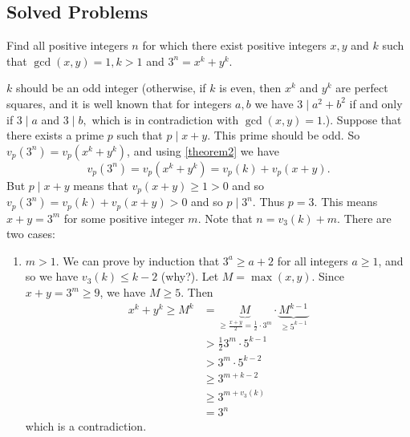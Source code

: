 \documentclass[main.tex]{subfile}
\begin{document}
\subsection{Solved Problems}


    \begin{problem}[Russia 1996]
        Find all positive integers $n$ for which there exist positive integers $x ,y$ and $k$ such that $\gcd(x,y)=1, k>1$ and $3^n = x^k + y^k.$
    \end{problem}

    \begin{solution}
        $k$ should be an odd integer (otherwise, if $k$ is even, then $x^k$ and $y^k$ are perfect squares, and it is well known that for integers $a,b$ we have $3 \mid a^2+b^2$ if and only if $3 \mid a$ and $3 \mid b,$ which is in contradiction with $\gcd(x,y)=1.$). Suppose that there exists a prime $p$ such that $p \mid x+y$. This prime should be odd. So $v_p(3^n)=v_p(x^k+y^k)$, and using \eqref{theorem2} we have $$v_p(3^n)=v_p(x^k+y^k)=v_p(k)+v_p(x+y).$$ But $p \mid x+y$ means that $v_p(x+y) \geq 1 >0$ and so $v_p(3^n)=v_p(k)+v_p(x+y) >0$ and so $p \mid 3^n$. Thus $p=3.$ This means $x+y=3^m$ for some positive integer $m$. Note that $n=v_3(k)+m$. There are two cases:
            \begin{enumerate}
                \item $m>1$. We can prove by induction that $3^a \ge a+2$ for all integers $a\ge 1$, and so we have $v_3(k) \leq k-2$ (why?). Let $M= \max(x,y)$. Since $x+y=3^m\ge 9$, we have $M \geq 5$. Then
                \begin{align*}
	                x^k+ y^k \geq M^k  & =  \underbrace{M}_{\geq \frac{x+y}{2} = \frac{1}{2} \cdot 3^m} \cdot \underbrace{M^{k-1}}_{\geq 5^{k-1}} \\
	                & > \frac{1}{2} 3^m \cdot 5^{k-1} \\
	                &  >3^m \cdot 5^{k-2}\\
	                & \geq 3^{m+k-2} \\
	                & \geq 3^{m + v_3(k)}\\
	                & = 3^n
                \end{align*}
                which is a contradiction.


\end{enumerate}
\end{solution}
\end{document}
